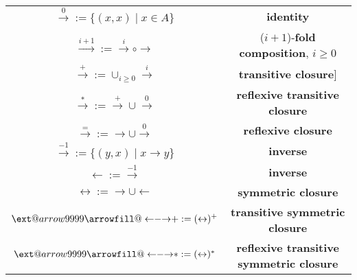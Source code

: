 \documentclass[titlepage, 12pt]{article}
\makeatletter
\newcommand\xleftrightarrow[2][]{%
\ext@arrow 9999{\longleftrightarrowfill@}{#1}{#2}}
\newcommand\longleftrightarrowfill@{%
\arrowfill@\leftarrow\relbar\rightarrow}
\makeatother
\begin{document}
\begin{center}
  \begin{tabular}{c c}

    $\xrightarrow{0} := \{(x, x)\mid x\in A\}$ & \textbf{identity}\\

    $\xrightarrow{i+1} := \xrightarrow{i}\circ\rightarrow$ &
    ($i+1$)-\textbf{fold composition}, $i\ge 0$\\

    $\xrightarrow{+} := \cup_{i\ge 0}\xrightarrow{i}$ & \textbf{transitive
    closure}]\\

      $\xrightarrow{*} := \xrightarrow{+}\cup\xrightarrow{0}$ &
      \textbf{reflexive transitive closure}\\

      $\xrightarrow{=} := \rightarrow\cup\xrightarrow{0}$ & \textbf{reflexive
      closure}\\

        $\xrightarrow{-1} := \{(y, x)\mid x\rightarrow y\}$ & \textbf{inverse}\\

        $\leftarrow := \xrightarrow{-1}$ & \textbf{inverse}\\

        $\leftrightarrow := \rightarrow\cup\leftarrow$ & \textbf{symmetric
        closure}\\

          $\xleftrightarrow{+} := (\leftrightarrow)^+$ & \textbf{transitive symmetric
          closure}\\

            $\xleftrightarrow{*} := (\leftrightarrow)^*$ & \textbf{reflexive transitive
            symmetric closure}

  \end{tabular}
\end{center}
\end{document}
